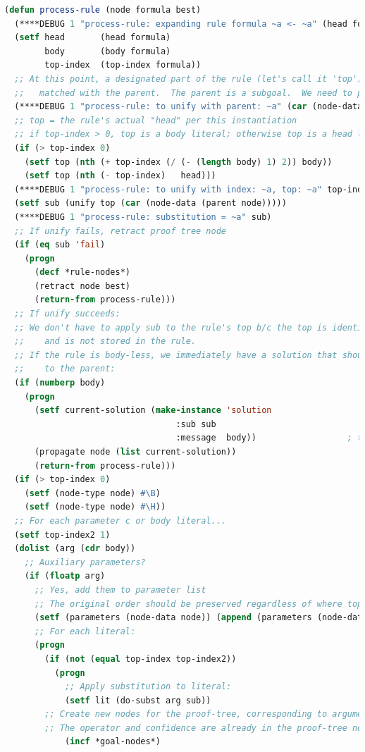 \begin{lstlisting}[language=Lisp]
(defun process-rule (node formula best)
  (****DEBUG 1 "process-rule: expanding rule formula ~a <- ~a" (head formula) (body formula))
  (setf head       (head formula)
        body       (body formula)
        top-index  (top-index formula))
  ;; At this point, a designated part of the rule (let's call it 'top') is already (partly)
  ;;   matched with the parent.  The parent is a subgoal.  We need to perform unify on them.
  (****DEBUG 1 "process-rule: to unify with parent: ~a" (car (node-data (parent node))))
  ;; top = the rule's actual "head" per this instantiation
  ;; if top-index > 0, top is a body literal; otherwise top is a head literal
  (if (> top-index 0)
    (setf top (nth (+ top-index (/ (- (length body) 1) 2)) body))
    (setf top (nth (- top-index)   head)))
  (****DEBUG 1 "process-rule: to unify with index: ~a, top: ~a" top-index top)
  (setf sub (unify top (car (node-data (parent node)))))
  (****DEBUG 1 "process-rule: substitution = ~a" sub)
  ;; If unify fails, retract proof tree node
  (if (eq sub 'fail)
    (progn
      (decf *rule-nodes*)
      (retract node best)
      (return-from process-rule)))
  ;; If unify succeeds:
  ;; We don't have to apply sub to the rule's top b/c the top is identical with the parent
  ;;    and is not stored in the rule.
  ;; If the rule is body-less, we immediately have a solution that should be propagated up
  ;;    to the parent:
  (if (numberp body)
    (progn
      (setf current-solution (make-instance 'solution
                                  :sub sub
                                  :message  body))                  ; the TV is the body
      (propagate node (list current-solution))
      (return-from process-rule)))
  (if (> top-index 0)
    (setf (node-type node) #\B)
    (setf (node-type node) #\H))
  ;; For each parameter c or body literal...
  (setf top-index2 1)
  (dolist (arg (cdr body))
    ;; Auxiliary parameters?
    (if (floatp arg)
      ;; Yes, add them to parameter list
      ;; The original order should be preserved regardless of where top-index is.
      (setf (parameters (node-data node)) (append (parameters (node-data node)) (list arg)))
      ;; For each literal:
      (progn
        (if (not (equal top-index top-index2))
          (progn
            ;; Apply substitution to literal:
            (setf lit (do-subst arg sub))
        ;; Create new nodes for the proof-tree, corresponding to arguments of the rule:
        ;; The operator and confidence are already in the proof-tree node
            (incf *goal-nodes*)

\end{lstlisting}
